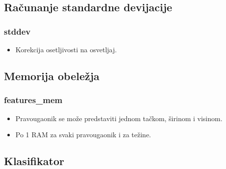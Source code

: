 \documentclass{beamer}
\begin{document}
\subsection{Računanje standardne devijacije}

\begin{frame}
  \frametitle<1-1>{stddev}

  \begin{itemize}
  \item<1-1> Korekcija osetljivosti na osvetljaj.

  \end{itemize}

  \begin{figure}[H]
  \end{figure}
\end{frame}

\subsection{Memorija obeležja}

\begin{frame}
  \frametitle<1-1>{features\_mem}

  \begin{itemize}
  \item<1-2> Pravougaonik se može predstaviti jednom tačkom, širinom i visinom.
  \item<2-2> Po 1 RAM za svaki pravougaonik i za težine.

  \end{itemize}

  \begin{figure}[H]
  \end{figure}
\end{frame}

\subsection{Klasifikator}
\end{document}
